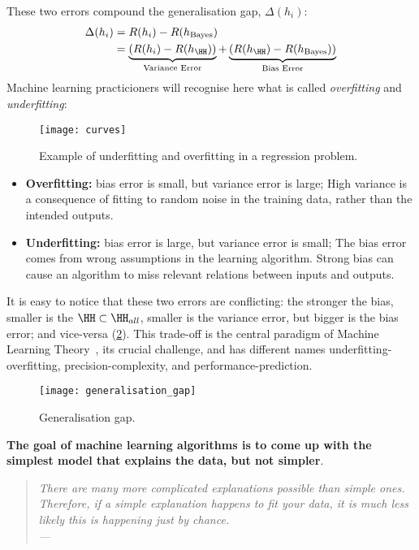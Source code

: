 These two errors compound the generalisation gap, \(\Delta(h_i)\):
\begin{align}
	\Delta(h_i) &= R(h_i)-R(h_{\text{Bayes}}) \\
	&= \underbrace{(R(h_i)-R(h_\HH))}_{\text{Variance Error}}+ \underbrace{(R(h_\HH)-R(h_{\text{Bayes}}) )}_{\text{Bias Error}}
\end{align}
Machine learning practicioners will recognise here what is called \emph{overfitting} and \emph{underfitting}:
\begin{figure}
	[ht!] \centering
	\texttt{[image: curves]}
	\caption{Example of underfitting and overfitting in a regression problem.}\label{fig:underfitting-overfitting} \end{figure}
\begin{itemize}
	\item \textbf{Overfitting:} bias error is small, but variance error is large; High variance is a consequence of fitting to random noise in the training data, rather than the intended outputs.
	\item \textbf{Underfitting:} bias error is large, but variance error is small; The bias error comes from wrong assumptions in the learning algorithm. Strong bias can cause an algorithm to miss relevant relations between inputs and outputs.
\end{itemize}
It is easy to notice that these two errors are conflicting: the stronger the bias, smaller is the \(\HH \subset \HH_{all}\), smaller is the variance error, but bigger is the bias error; and vice-versa (\cref{fig:generalisation_gap}). This trade-off is the central paradigm of Machine Learning Theory~\cite{slonim:2002}, its crucial challenge, and has different names underfitting-overfitting, precision-complexity, and performance-prediction.
\begin{figure}
	[ht!] \centering
	\texttt{[image: generalisation\_gap]}
	\caption{Generalisation gap.}\label{fig:generalisation_gap}
\end{figure}
\textbf{The goal of machine learning algorithms is to come up with the simplest model that explains the data, but not simpler}.
\begin{quotation}
	\small \textit{ \flushright There are many more complicated explanations possible than simple ones. Therefore, if a simple explanation happens to fit your data, it is much less likely this is happening just by chance.\\
	\flushright ---~\citeauthor{blum:2007}\\
	}
\end{quotation}
